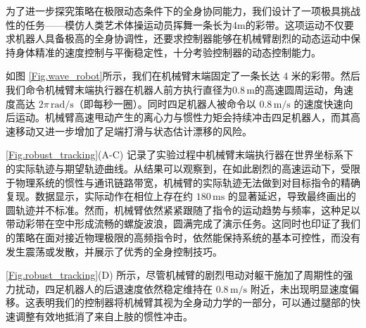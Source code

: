 为了进一步探究策略在极限动态条件下的全身协同能力，我们设计了一项极具挑战性的任务——模仿人类艺术体操运动员挥舞一条长为4m的彩带。这项运动不仅要求机器人具备极高的全身协调性，还要求控制器能够在机械臂剧烈的动态运动中保持身体精准的速度控制与平衡稳定性，十分考验控制器的动态控制能力。

如图 \ref{Fig.wave_robot}所示，我们在机械臂末端固定了一条长达 4 米的彩带。然后我们命令机械臂末端执行器在机器人前方执行直径为$0.8\,\text{m}$的高速圆周运动，角速度高达 $2\pi\,\text{rad/s}$（即每秒一圈）。同时四足机器人被命令以 $0.8\,\text{m/s}$ 的速度快速向后运动。机械臂高速甩动产生的离心力与惯性力矩会持续冲击四足机器人，而其高速移动又进一步增加了足端打滑与状态估计漂移的风险。

\autoref{Fig.robust_tracking}(A-C) 记录了实验过程中机械臂末端执行器在世界坐标系下的实际轨迹与期望轨迹曲线。从结果可以观察到，在如此剧烈的高速运动下，受限于物理系统的惯性与通讯链路带宽，机械臂的实际轨迹无法做到对目标指令的精确复现。数据显示，实际动作在相位上存在约 $180\,\text{ms}$ 的显著延迟，导致最终画出的圆轨迹并不标准。然而，机械臂依然紧紧跟随了指令的运动趋势与频率，这种足以带动彩带在空中形成流畅的螺旋波浪，圆满完成了演示任务。这同时也印证了我们的策略在面对接近物理极限的高频指令时，依然能保持系统的基本可控性，而没有发生震荡或发散，并展示了优秀的全身控制技巧。

\autoref{Fig.robust_tracking}(D) 所示，尽管机械臂的剧烈甩动对躯干施加了周期性的强力扰动，四足机器人的后退速度依然稳定维持在 $0.8\,\text{m/s}$ 附近，未出现明显速度偏移。这表明我们的控制器将机械臂其视为全身动力学的一部分，可以通过腿部的快速调整有效地抵消了来自上肢的惯性冲击。

